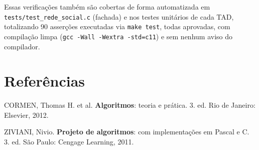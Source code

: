 \documentclass[
	12pt,				%
	oneside,			%
	a4paper,			%
	chapter=TITLE,		%
	brazil,				%
	]{abntex2}
\begin{document}
Essas verificações também são cobertas de forma automatizada em
\texttt{tests/\allowbreak test\_rede\_social.c} (fachada) e nos testes unitários de
cada TAD, totalizando 90 asserções executadas via \texttt{make test}, todas
aprovadas, com compilação limpa (\texttt{gcc -Wall -Wextra -std=c11}) e sem
nenhum aviso do compilador.

\postextual

\chapter*{Referências}

\noindent
CORMEN, Thomas H. et al. \textbf{Algoritmos}: teoria e prática. 3. ed. Rio
de Janeiro: Elsevier, 2012.

\noindent
ZIVIANI, Nivio. \textbf{Projeto de algoritmos}: com implementações em
Pascal e C. 3. ed. São Paulo: Cengage Learning, 2011.
\end{document}
